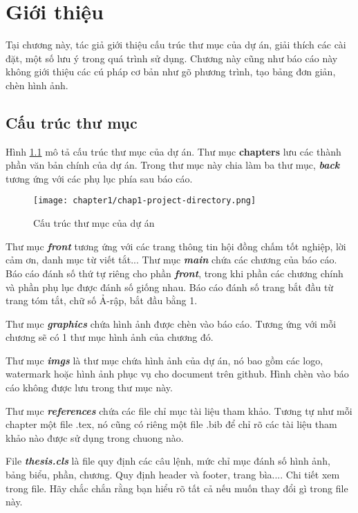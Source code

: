 \chapter{Giới thiệu}
\label{chap:chap1-introduce}


Tại chương này, tác giả giới thiệu cấu trúc thư mục của dự án, giải thích các cài đặt, một số lưu ý trong quá trình sử dụng. Chương này cũng như báo cáo này không giới thiệu các cú pháp cơ bản như gõ phương trình, tạo bảng đơn giản, chèn hình ảnh.

\section{Cấu trúc thư mục}

\indent Hình \ref{fig:chap1-project-directory} mô tả cấu trúc thư mục của dự án. Thư mục \textbf{chapters} lưu các thành phần văn bản chính của dự án. Trong thư mục này chia làm ba thư mục, \textbf{\textit{back}} tương ứng với các phụ lục phía sau báo cáo.

\begin{figure}
    \centering
    \texttt{[image: chapter1/chap1-project-directory.png]}
    \caption{Cấu trúc thư mục của dự án}
    \label{fig:chap1-project-directory}
\end{figure}

Thư mục \textbf{\textit{front}} tương ứng với các trang thông tin hội đồng chấm tốt nghiệp, lời cảm ơn, danh mục từ viết tắt... Thư mục \textbf{\textit{main}} chứa các chương của báo cáo. Báo cáo đánh số thứ tự riêng cho phần \textit{\textbf{front}}, trong khi phần các chương chính và phần phụ lục được đánh số giống nhau. Báo cáo đánh số trang bắt đầu từ trang tóm tắt, chữ số Ả-rập, bắt đầu bằng 1.

Thư mục \textbf{\textit{graphics}} chứa hình ảnh được chèn vào báo cáo. Tương ứng với mỗi chương sẽ có 1 thư mục hình ảnh của chương đó.

Thư mục \textbf{\textit{imgs}} là thư mục chứa hình ảnh của dự án, nó bao gồm các logo, watermark hoặc hình ảnh phục vụ cho document trên github. Hình chèn vào báo cáo không được lưu trong thư mục này.

Thư mục \textbf{\textit{references}} chứa các file chỉ mục tài liệu tham khảo. Tương tự như mỗi chapter một file .tex, nó cũng có riêng một file .bib để chỉ rõ các tài liệu tham khảo nào được sử dụng trong chuong nào.

File \textbf{\textit{thesis.cls}} là file quy định các câu lệnh, mức chỉ mục đánh số hình ảnh, bảng biểu, phần, chương. Quy định header và footer, trang  bìa.... Chi tiết xem trong file. Hãy chắc chắn rằng bạn hiểu rõ tất cả nếu muốn thay đổi gì trong file này.

